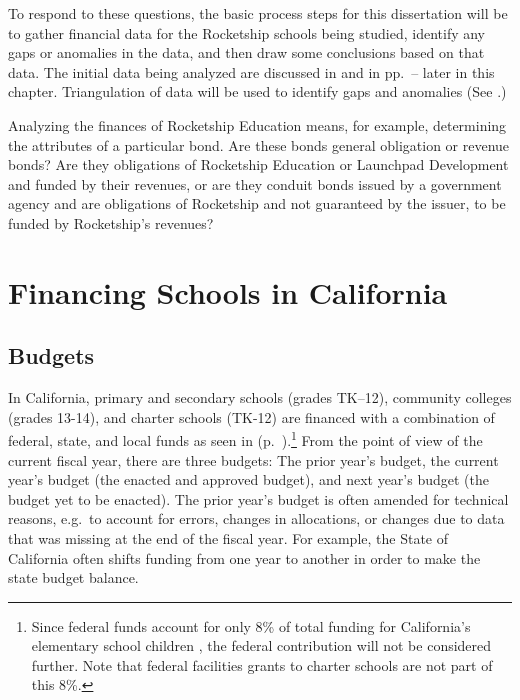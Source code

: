 To respond to these questions, the basic process steps for this dissertation will be to %
%
gather financial data for the Rocketship schools being studied, identify any gaps or anomalies in the data, and then draw some conclusions based on that data.  The initial data being analyzed are discussed in  and  in pp.~\pageref{sec:financing-ca-overview}–\pageref{sec:charter-school-financing} later in this chapter. Triangulation of data will be used to identify gaps and anomalies (See .)

Analyzing the finances of Rocketship Education means, for example, determining the attributes of a particular bond. Are these bonds general obligation or revenue bonds? Are they obligations of Rocketship Education or Launchpad Development and funded by their revenues, or are they conduit bonds issued by a government agency and are obligations of Rocketship and not guaranteed by the issuer, to be funded by Rocketship's revenues?

\section{Financing Schools in California}\label{sec:financing-ca-overview}%

\subsection{Budgets}%

In California, primary and secondary schools (grades TK–12), community colleges (grades 13-14), and charter schools (TK-12) are financed with a combination of federal, state, and local funds as seen in  (p.~\pageref{fig:2019–20_K–12_Funding}).\footnote{Since federal funds account for only 8\% of total funding for California's elementary school children \parencite{LAO2021}, the federal contribution will not be considered further. Note that federal facilities grants to charter schools are not part of this 8\%.} From the point of view of the current fiscal year, there are three budgets: The prior year's budget, the current year's budget (the enacted and approved budget), and next year's budget (the budget yet to be enacted). The prior year's budget is often amended for technical reasons, e.g.~to account for errors, changes in allocations, or changes due to data that was missing at the end of the fiscal year. For example, the State of California often shifts funding from one year to another in order to make the state budget balance.

